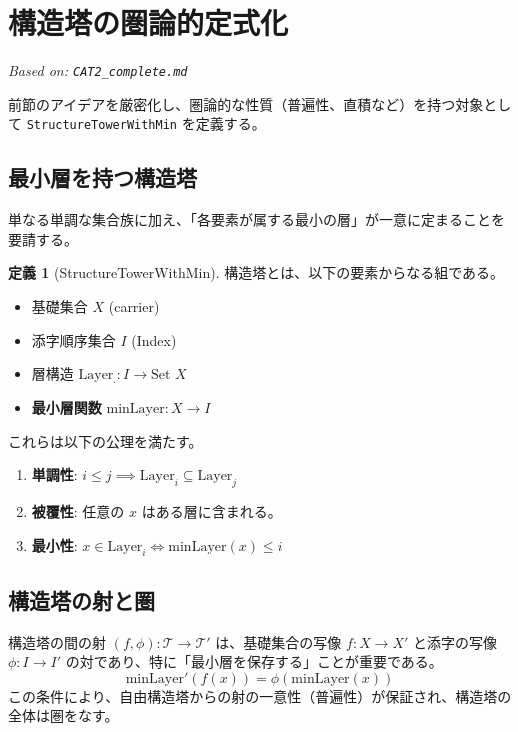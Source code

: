 \documentclass[a4paper,11pt]{ltjsarticle}
\theoremstyle{definition}
\newtheorem{definition}{定義}[section]
\newcommand{\Tower}{\mathcal{T}}
\newcommand{\Layer}[1]{\mathrm{Layer}_{#1}}
\newcommand{\MinLayer}{\mathrm{minLayer}}
\begin{document}
\section{構造塔の圏論的定式化}
\label{sec:cat2}
\textit{Based on: \texttt{CAT2\_complete.md}}

前節のアイデアを厳密化し、圏論的な性質（普遍性、直積など）を持つ対象として \texttt{StructureTowerWithMin} を定義する。

\subsection{最小層を持つ構造塔}
単なる単調な集合族に加え、「各要素が属する最小の層」が一意に定まることを要請する。

\begin{definition}[StructureTowerWithMin]
構造塔とは、以下の要素からなる組である。
\begin{itemize}
    \item 基礎集合 $X$ (carrier)
    \item 添字順序集合 $I$ (Index)
    \item 層構造 $\Layer{\cdot}: I \to \text{Set } X$
    \item \textbf{最小層関数} $\MinLayer: X \to I$
\end{itemize}
これらは以下の公理を満たす。
\begin{enumerate}
    \item \textbf{単調性}: $i \le j \implies \Layer{i} \subseteq \Layer{j}$
    \item \textbf{被覆性}: 任意の $x$ はある層に含まれる。
    \item \textbf{最小性}: $x \in \Layer{i} \iff \MinLayer(x) \le i$
\end{enumerate}
\end{definition}

\subsection{構造塔の射と圏}
構造塔の間の射 $(f, \phi): \Tower \to \Tower'$ は、基礎集合の写像 $f: X \to X'$ と添字の写像 $\phi: I \to I'$ の対であり、特に「最小層を保存する」ことが重要である。
\[ \MinLayer'(f(x)) = \phi(\MinLayer(x)) \]
この条件により、自由構造塔からの射の一意性（普遍性）が保証され、構造塔の全体は圏をなす。
\end{document}
